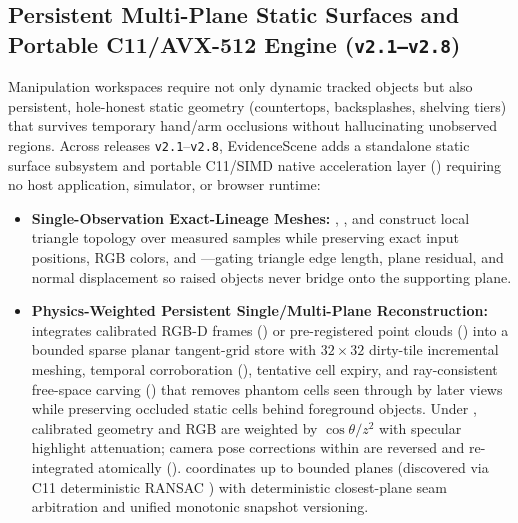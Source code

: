 \documentclass{evidencescene}
\begin{document}
\subsection{Persistent Multi-Plane Static Surfaces and Portable C11/AVX-512 Engine (\texttt{v2.1--v2.8})}
\label{sec:persistent_c11}
Manipulation workspaces require not only dynamic tracked objects but also persistent, hole-honest static geometry (countertops, backsplashes, shelving tiers) that survives temporary hand/arm occlusions without hallucinating unobserved regions. Across releases \texttt{v2.1}--\texttt{v2.8}, EvidenceScene adds a standalone static surface subsystem and portable C11/SIMD native acceleration layer () requiring no host application, simulator, or browser runtime:
\begin{itemize}
    \item \textbf{Single-Observation Exact-Lineage Meshes:} , , and  construct local triangle topology over measured samples while preserving exact input positions, RGB colors, and ---gating triangle edge length, plane residual, and normal displacement so raised objects never bridge onto the supporting plane.
    \item \textbf{Physics-Weighted Persistent Single/Multi-Plane Reconstruction:}  integrates calibrated RGB-D frames () or pre-registered point clouds () into a bounded sparse planar tangent-grid store with $32\times 32$ dirty-tile incremental meshing, temporal corroboration (), tentative cell expiry, and ray-consistent free-space carving () that removes phantom cells seen through by later views while preserving occluded static cells behind foreground objects. Under , calibrated geometry and RGB are weighted by $\cos\theta/z^2$ with specular highlight attenuation; camera pose corrections within  are reversed and re-integrated atomically ().  coordinates up to  bounded planes (discovered via C11 deterministic RANSAC ) with deterministic closest-plane seam arbitration and unified monotonic snapshot versioning.

\end{itemize}
\end{document}
